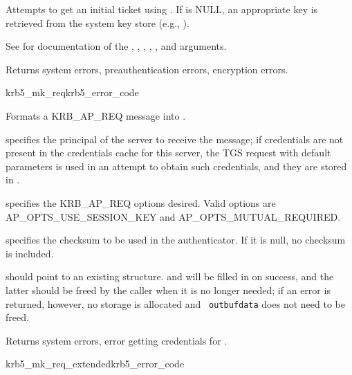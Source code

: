 Attempts to get an initial ticket using .  If
 is NULL, an appropriate key is retrieved from the
system key store (e.g., ).

See  for documentation of the
, , ,
, ,  and
 arguments.

Returns system errors, preauthentication errors, encryption errors.

\begin{funcdecl}{krb5_mk_req}{krb5_error_code}{\funcin}
\funcout
{}
\end{funcdecl}

Formats a KRB_AP_REQ message into .

 specifies the principal of the server to receive the
message; if credentials are not present in the credentials cache
 for this server, the TGS request with default
parameters is used in an attempt to obtain such credentials, and they
are stored in .

 specifies the KRB_AP_REQ options desired.
Valid options are
AP_OPTS_USE_SESSION_KEY and 
AP_OPTS_MUTUAL_REQUIRED.

 specifies the checksum to be used in the
authenticator.  If it is null, no checksum is included.


 should point to an existing 
structure.   and
 will be filled in on success, and the latter
should be freed by the caller when it is no longer needed; if an error
is returned, however, no storage is allocated and {\tt
outbuf{\ptsto}data} does not need to be freed.

Returns system errors, error getting credentials for
.

\begin{funcdecl}{krb5_mk_req_extended}{krb5_error_code}{\funcin}
\funcinout
{}
\funcout
{}
\end{funcdecl}

